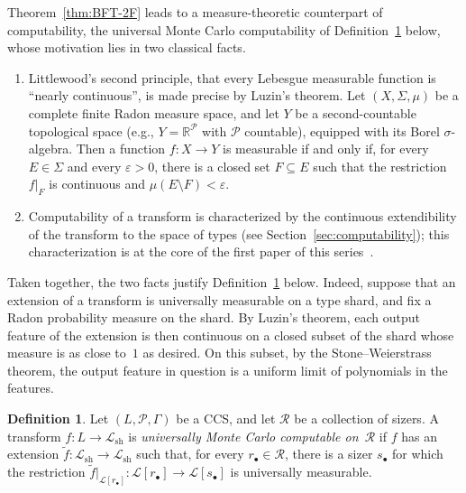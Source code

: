 \documentclass[psamsfonts]{amsart}
\theoremstyle{definition}
\newtheorem{defn}[thm]{Definition}
\theoremstyle{remark}
\newcommand{\sh}{\text{sh}}
\numberwithin{equation}{section}
\begin{document}
Theorem~\ref{thm:BFT-2F} leads to a measure-theoretic counterpart of computability, the universal Monte Carlo computability of Definition~\ref{def:universally-essentially-computable} below, whose motivation lies in two classical facts.

\begin{enumerate}
\item
  Littlewood’s second principle, that every Lebesgue measurable function is “nearly continuous”, is made precise by Luzin’s theorem.
  Let $(X,\Sigma ,\mu )$ be a complete finite Radon measure space, and let $Y$ be a second-countable topological space (e.g., $Y=\mathbb{R}^\mathcal{P}$ with $\mathcal{P}$ countable), equipped with its Borel $\sigma$-algebra.
  Then a function $f\colon X\to Y$ is measurable if and only if, for every $E\in\Sigma$ and every $\varepsilon>0$, there is a closed set $F\subseteq E$ such that the restriction $f|_F$ is continuous and $\mu(E\setminus F) < \varepsilon$.
\item
  Computability of a transform is characterized by the continuous extendibility of the transform to the space of types (see Section~\ref{sec:computability});
  this characterization is at the core of the first paper of this series~\cite{alva2024approximability}.
\end{enumerate}
Taken together, the two facts justify Definition~\ref{def:universally-essentially-computable} below.
Indeed, suppose that an extension of a transform is universally measurable on a type shard, and fix a Radon probability measure on the shard.
By Luzin’s theorem, each output feature of the extension is then continuous on a closed subset of the shard whose measure is as close to~$1$ as desired.
On this subset, by the Stone--Weierstrass theorem, the output feature in question is a uniform limit of polynomials in the features.

\begin{defn}
  \label{def:universally-essentially-computable}
  Let $(L,\mathcal{P},\Gamma)$ be a CCS, and let $\mathscr{R}$ be a collection of sizers.
  A transform $f\colon L\to\mathcal{L}_{\sh}$ is \emph{universally Monte Carlo computable on~$\mathscr{R}$} if $f$ has an extension $\tilde f\colon\mathcal{L}_{\sh}\to \mathcal{L}_{\sh}$ such that, for every $r_\bullet\in \mathscr{R}$, there is a sizer $s_\bullet$ for which the restriction $\tilde f|_{\mathcal{L}[r_{\bullet}]}\colon\mathcal{L}[r_\bullet]\to\mathcal{L}[s_\bullet]$ is universally measurable.
\end{defn}
\end{document}
